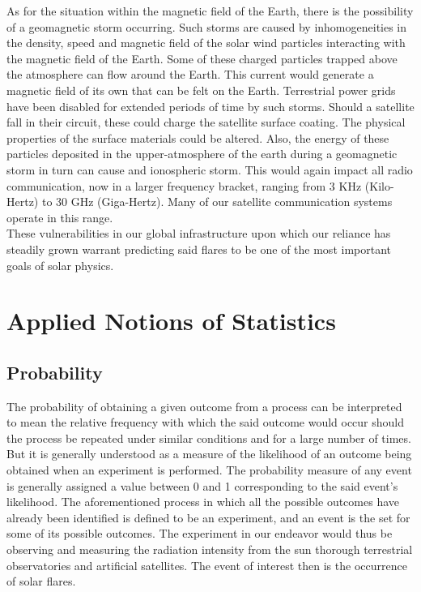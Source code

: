 \documentclass[12pt,twoside]{reedthesis}
\begin{document}
As for the situation within the magnetic field of the Earth, there is the possibility of a geomagnetic storm occurring. Such storms are caused by inhomogeneities in the density, speed and magnetic field of the solar wind particles interacting with the magnetic field of the Earth. Some of these charged particles trapped above the atmosphere can flow around the Earth. This current would generate a magnetic field of its own that can be felt on the Earth. Terrestrial power grids have been disabled for extended periods of time by such storms. Should a satellite fall in their circuit, these could charge the satellite surface coating. The physical properties of the surface materials could be altered. Also, the energy of these particles deposited in the upper-atmosphere of the earth during a geomagnetic storm in turn can cause and ionospheric storm. This would again impact all radio communication, now in a larger frequency bracket, ranging from 3 KHz (Kilo-Hertz) to 30 GHz (Giga-Hertz). Many of our satellite communication systems operate in this range.    \\

These vulnerabilities in our global infrastructure upon which our reliance has steadily grown warrant predicting said flares to be one of the most important goals of solar physics. \\


\chapter{Applied Notions of Statistics}
		
\section{Probability}
The probability of obtaining a given outcome from a process can be interpreted to mean the relative frequency with which the said outcome would occur should the process be repeated under similar conditions and for a large number of times. But it is generally understood as a measure of the likelihood of an outcome being obtained when an experiment is performed. The probability measure of any event is generally assigned a value between 0 and 1 corresponding to the said event’s likelihood. The aforementioned process in which all the possible outcomes have already been identified is defined to be an experiment, and an event is the set for some of its possible outcomes. The experiment in our endeavor would thus be observing and measuring the radiation intensity from the sun thorough terrestrial observatories and artificial satellites. The event of interest then is the occurrence of solar flares.\\
\end{document}
